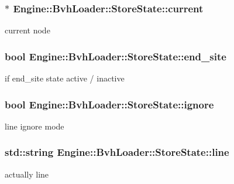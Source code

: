 \subsubsection[{current}]{$\ast$ Engine\+::\+Bvh\+Loader\+::\+Store\+State\+::current}\label{structEngine_1_1BvhLoader_1_1StoreState_ad83062579f793a9de2dcb408bbd9546b}
current node \hypertarget{structEngine_1_1BvhLoader_1_1StoreState_a9c8556dfae21548e31f532976c6e8ce3}{}
\subsubsection[{end\+\_\+site}]{\setlength{\rightskip}{0pt plus 5cm}bool Engine\+::\+Bvh\+Loader\+::\+Store\+State\+::end\+\_\+site}\label{structEngine_1_1BvhLoader_1_1StoreState_a9c8556dfae21548e31f532976c6e8ce3}
if end\+\_\+site state active / inactive \hypertarget{structEngine_1_1BvhLoader_1_1StoreState_a67e2ab4804024f0200dfbb335cb33d78}{}
\subsubsection[{ignore}]{\setlength{\rightskip}{0pt plus 5cm}bool Engine\+::\+Bvh\+Loader\+::\+Store\+State\+::ignore}\label{structEngine_1_1BvhLoader_1_1StoreState_a67e2ab4804024f0200dfbb335cb33d78}
line ignore mode \hypertarget{structEngine_1_1BvhLoader_1_1StoreState_acaeea33c2fb2172627c6fb2aef5acc79}{}
\subsubsection[{line}]{\setlength{\rightskip}{0pt plus 5cm}std\+::string Engine\+::\+Bvh\+Loader\+::\+Store\+State\+::line}\label{structEngine_1_1BvhLoader_1_1StoreState_acaeea33c2fb2172627c6fb2aef5acc79}
actually line \hypertarget{structEngine_1_1BvhLoader_1_1StoreState_ac01f720a48885dc6e03901b9765b2db2}{}
